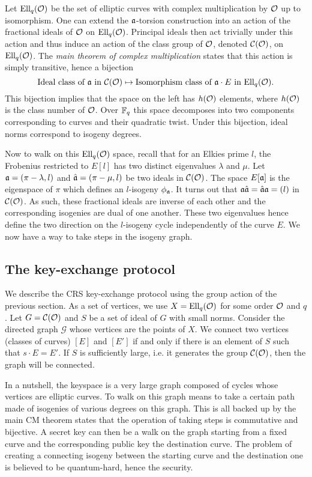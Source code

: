 \documentclass[../main/main.tex]{subfiles}
\begin{document}
Let $\text{Ell}_q(\mathcal{O})$ be the set of elliptic curves with complex multiplication by $\mathcal{O}$ up to isomorphism.
One can extend the $\mathfrak{a}$-torsion construction into an action of the fractional ideals of $\mathcal{O}$ on $\text{Ell}_q(\mathcal{O})$.
Principal ideals then act trivially under this action and thus induce an action of the class group of $\mathcal{O}$, denoted $\mathcal{C}(\mathcal{O})$, on $\text{Ell}_q(\mathcal{O})$.
The \textit{main theorem of complex multiplication} states that this action is simply transitive, hence a bijection
\[
	\text{Ideal class of }\mathfrak{a}\text{ in }\mathcal{C}(\mathcal{O}) \mapsto \text{Isomorphism class of } \mathfrak{a}\cdot E\text{ in } \text{Ell}_q(\mathcal{O}).
\]
This bijection implies that the space on the left has $h(\mathcal{O})$ elements, where $h(\mathcal{O})$ is the class number of $\mathcal{O}$.
Over $\mathbb{F}_q$ this space decomposes into two components corresponding to curves and their quadratic twist.
Under this bijection, ideal norms correspond to isogeny degrees.

Now to walk on this $\text{Ell}_q(\mathcal{O})$ space, recall that for an Elkies prime $l$, the Frobenius restricted to $E[l]$ has two distinct eigenvalues $\lambda$ and $\mu$.
Let $\mathfrak{a} = (\pi-\lambda, l)$ and $\hat{\mathfrak{a}} = (\pi-\mu, l)$ be two ideals in $\mathcal{C}(\mathcal{O})$.
The space $E[\mathfrak{a}]$ is the eigenspace of $\pi$ which defines an $l$-isogeny $\phi_{\mathfrak{a}}$.
It turns out that $\mathfrak{a}\hat{\mathfrak{a}} = \hat{\mathfrak{a}}\mathfrak{a} = (l)$ in $\mathcal{C}(\mathcal{O})$.
As such, these fractional ideals are inverse of each other and the corresponding isogenies are dual of one another.
These two eigenvalues hence define the two direction on the $l$-isogeny cycle independently of the curve $E$.
We now have a way to take steps in the isogeny graph.

\subsection{The key-exchange protocol}
We describe the CRS key-exchange protocol using the group action of the previous section.
As a set of vertices, we use $X=\text{Ell}_q(\mathcal{O})$ for some order $\mathcal{O}$ and $q$.
Let $G=\mathcal{C}(\mathcal{O})$ and $S$ be a set of ideal of $G$ with small norms.
Consider the directed graph $\mathcal{G}$ whose vertices are the points of $X$.
We connect two vertices (classes of curves) $[E]$ and $[E']$  if and only if there is an element of $S$ such that $s\cdot E = E'$.
If $S$ is sufficiently large, i.e. it generates the group $\mathcal{C}(\mathcal{O})$, then the graph will be connected.

In a nutshell, the keyspace is a very large graph composed of cycles whose vertices are elliptic curves.
To walk on this graph means to take a certain path made of isogenies of various degrees on this graph.
This is all backed up by the main CM theorem states that the operation of taking steps is commutative and bijective.
A secret key can then be a walk on the graph starting from a fixed curve and the corresponding public key the destination curve.
The problem of creating a connecting isogeny between the starting curve and the destination one is believed to be quantum-hard, hence the security.
\end{document}
